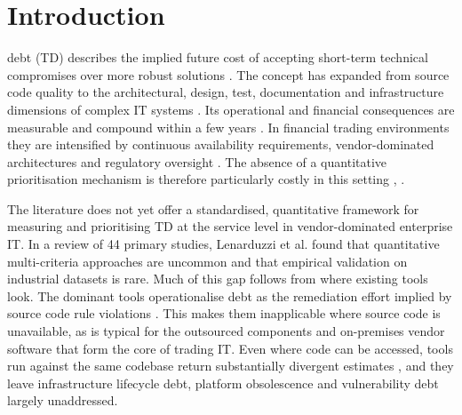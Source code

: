 \documentclass[
  journal,
]{IEEEtran}%
\begin{document}
%


\section{Introduction}\label{sec-intro}

 debt (TD) describes the implied future cost
of accepting short-term technical compromises over more robust solutions
. The
concept has expanded from source code quality to the architectural,
design, test, documentation and infrastructure dimensions of complex IT
systems . Its
operational and financial consequences are measurable and compound
within a few years .
In financial trading environments they are intensified by continuous
availability requirements, vendor-dominated architectures and regulatory
oversight . The absence of
a quantitative prioritisation mechanism is therefore particularly costly
in this setting ,
.

The literature does not yet offer a standardised, quantitative framework
for measuring and prioritising TD at the service level in
vendor-dominated enterprise IT. In a review of 44 primary studies,
Lenarduzzi et al.
 found
that quantitative multi-criteria approaches are uncommon and that
empirical validation on industrial datasets is rare. Much of this gap
follows from where existing tools look. The dominant tools
operationalise debt as the remediation effort implied by source code
rule violations
. This makes
them inapplicable where source code is unavailable, as is typical for
the outsourced components and on-premises vendor software that form the
core of trading IT. Even where code can be accessed, tools run against
the same codebase return substantially divergent estimates
, and
they leave infrastructure lifecycle debt, platform obsolescence and
vulnerability debt largely unaddressed.
\end{document}
